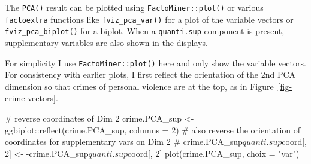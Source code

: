 \documentclass[
  letterpaper,
  10pt,
  krantz2]{krantz}
\makeatletter
\newenvironment{Shaded}{\begin{snugshade}}{\end{snugshade}}
\newcommand{\AttributeTok}[1]{\textcolor[rgb]{0.40,0.45,0.13}{#1}}
\newcommand{\CommentTok}[1]{\textcolor[rgb]{0.37,0.37,0.37}{#1}}
\newcommand{\DecValTok}[1]{\textcolor[rgb]{0.68,0.00,0.00}{#1}}
\newcommand{\FloatTok}[1]{\textcolor[rgb]{0.68,0.00,0.00}{#1}}
\newcommand{\FunctionTok}[1]{\textcolor[rgb]{0.28,0.35,0.67}{#1}}
\newcommand{\NormalTok}[1]{\textcolor[rgb]{0.00,0.23,0.31}{#1}}
\newcommand{\OtherTok}[1]{\textcolor[rgb]{0.00,0.23,0.31}{#1}}
\newcommand{\SpecialCharTok}[1]{\textcolor[rgb]{0.37,0.37,0.37}{#1}}
\newcommand{\StringTok}[1]{\textcolor[rgb]{0.13,0.47,0.30}{#1}}
\newenvironment{kframe}{%
  \medskip{}
  \setlength{\fboxsep}{.8em}
  \def\at@end@of@kframe{}%
  \ifinner\ifhmode%
  \def\at@end@of@kframe{\end{minipage}}%
  \begin{minipage}{\columnwidth}%
  \fi\fi%
  \def\FrameCommand##1{\hskip\@totalleftmargin \hskip-\fboxsep
  \colorbox{shadecolor}{##1}\hskip-\fboxsep
      \hskip-\linewidth \hskip-\@totalleftmargin \hskip\columnwidth}%
  \MakeFramed {\advance\hsize-\width
    \@totalleftmargin\z@ \linewidth\hsize
    \@setminipage}}%
{\par\unskip\endMakeFramed%
  \at@end@of@kframe}
\renewenvironment{Shaded}{\begin{kframe}}{\end{kframe}}
\makeatother
\begin{document}
\begin{Shaded}
\end{Shaded}

The \texttt{PCA()} result can be plotted using
\texttt{FactoMiner::plot()} or various \texttt{factoextra} functions
like \texttt{fviz\_pca\_var()} for a plot of the variable vectors or
\texttt{fviz\_pca\_biplot()} for a biplot. When a \texttt{quanti.sup}
component is present, supplementary variables are also shown in the
displays.

For simplicity I use \texttt{FactoMiner::plot()} here and only show the
variable vectors. For consistency with earlier plots, I first reflect
the orientation of the 2nd PCA dimension so that crimes of personal
violence are at the top, as in Figure~\ref{fig-crime-vectors}.

\begin{Shaded}
\begin{Highlighting}[]
\CommentTok{\# reverse coordinates of Dim 2}
\NormalTok{crime.PCA\_sup }\OtherTok{\textless{}{-}}\NormalTok{ ggbiplot}\SpecialCharTok{::}\FunctionTok{reflect}\NormalTok{(crime.PCA\_sup, }\AttributeTok{columns =} \DecValTok{2}\NormalTok{)}
\CommentTok{\# also reverse the orientation of coordinates for supplementary vars on Dim 2}
\CommentTok{\# crime.PCA\_sup$quanti.sup$coord[, 2] \textless{}{-} {-}crime.PCA\_sup$quanti.sup$coord[, 2]}
\FunctionTok{plot}\NormalTok{(crime.PCA\_sup, }\AttributeTok{choix =} \StringTok{"var"}\NormalTok{)}
\end{Highlighting}
\end{Shaded}
\end{document}
